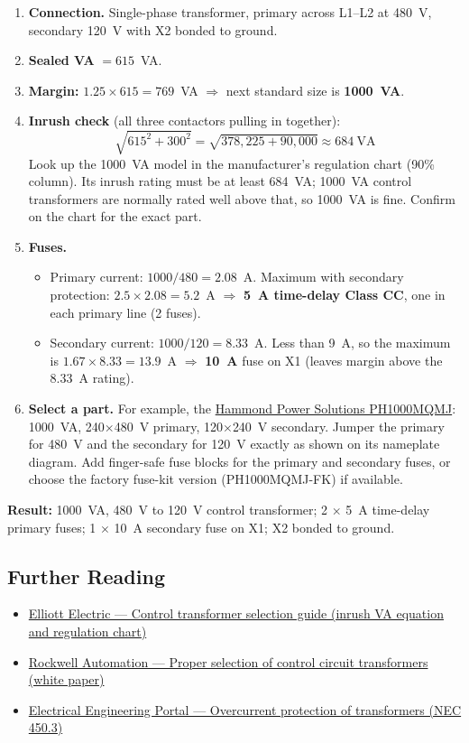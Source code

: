 \begin{enumerate}[itemsep=4pt]
  \item \textbf{Connection.} Single-phase transformer, primary across L1--L2 at 480~V, secondary 120~V with X2 bonded to ground.
  \item \textbf{Sealed VA} $= 615$~VA.
  \item \textbf{Margin:} $1.25 \times 615 = 769$~VA $\Rightarrow$ next standard size is \textbf{1000~VA}.
  \item \textbf{Inrush check} (all three contactors pulling in together):
  \[
    \sqrt{615^2 + 300^2} = \sqrt{378{,}225 + 90{,}000} \approx 684~\text{VA}
  \]
  Look up the 1000~VA model in the manufacturer's regulation chart (90\% column). Its inrush rating must be at least 684~VA; 1000~VA control transformers are normally rated well above that, so 1000~VA is fine. Confirm on the chart for the exact part.
  \item \textbf{Fuses.}
  \begin{itemize}[itemsep=1pt]
    \item Primary current: $1000 / 480 = 2.08$~A. Maximum with secondary protection: $2.5 \times 2.08 = 5.2$~A $\Rightarrow$ \textbf{5~A time-delay Class CC}, one in each primary line (2 fuses).
    \item Secondary current: $1000 / 120 = 8.33$~A. Less than 9~A, so the maximum is $1.67 \times 8.33 = 13.9$~A $\Rightarrow$ \textbf{10~A} fuse on X1 (leaves margin above the 8.33~A rating).
  \end{itemize}
  \item \textbf{Select a part.} For example, the \href{https://www.lamonde.com/ph1000mqmj.html}{Hammond Power Solutions PH1000MQMJ}: 1000~VA, 240$\times$480~V primary, 120$\times$240~V secondary. Jumper the primary for 480~V and the secondary for 120~V exactly as shown on its nameplate diagram. Add finger-safe fuse blocks for the primary and secondary fuses, or choose the factory fuse-kit version (PH1000MQMJ-FK) if available.
\end{enumerate}

\textbf{Result:} 1000~VA, 480~V to 120~V control transformer; 2 $\times$ 5~A time-delay primary fuses; 1 $\times$ 10~A secondary fuse on X1; X2 bonded to ground.

\subsection{Further Reading}
\begin{itemize}[itemsep=2pt]
  \item \href{https://www.elliottelectric.com/StaticPages/ElectricalReferences/Guides/control-transformer-selection-guide.aspx}{Elliott Electric --- Control transformer selection guide (inrush VA equation and regulation chart)}
  \item \href{https://literature.rockwellautomation.com/idc/groups/literature/documents/wp/1497-wp001_-en-p.pdf}{Rockwell Automation --- Proper selection of control circuit transformers (white paper)}
  \item \href{https://electrical-engineering-portal.com/overcurrent-protection-transformer-nec-450-3}{Electrical Engineering Portal --- Overcurrent protection of transformers (NEC 450.3)}
\end{itemize}
